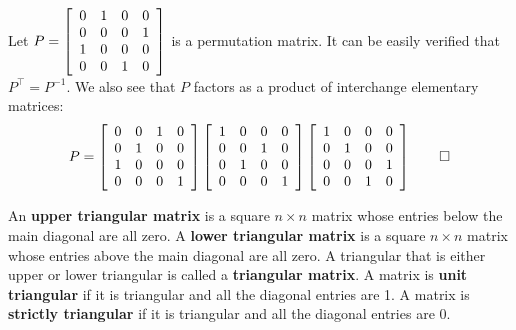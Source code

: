 \begin{Exam} Let $P = \mtx{rrrr}{0&1&0&0\\0&0&0&1\\1&0&0&0\\0&0&1&0}$ is a permutation matrix. It can be easily verified that $P^\top =P^{-1}$. We also see that $P$ factors as a product of interchange elementary matrices:
\[P = \mtx{rrrr}{0&0&1&0\\0&1&0&0\\1&0&0&0\\0&0&0&1}\mtx{rrrr}{1&0&0&0\\0&0&1&0\\0&1&0&0\\0&0&0&1}\mtx{rrrr}{1&0&0&0\\0&1&0&0\\0&0&0&1\\0&0&1&0}\qedhere\]
\end{Exam}\vs

\begin{Def}  An \textbf{upper triangular matrix} is a square $n\times n$ matrix whose entries below the main diagonal are all zero. A \textbf{lower triangular matrix} is a square $n\times n$ matrix whose entries above the main diagonal are all zero. A triangular that is either upper or lower triangular is called a \textbf{triangular matrix}. A matrix is \textbf{unit triangular} if it is triangular and all the diagonal entries are 1. A matrix is \textbf{strictly triangular} if it is triangular and all the diagonal entries are 0.
\end{Def}\vs


